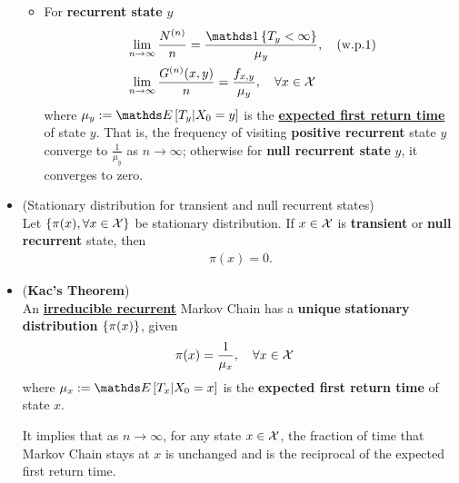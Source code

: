 \documentclass[11pt]{article}
\begin{document}
\begin{itemize}
\begin{itemize}
\item \begin{theorem}
For \textbf{recurrent state} $y$
\begin{align*}
&\lim_{n\rightarrow \infty}\frac{N^{(n)}}{n} = \frac{\ind{T_{y} < \infty}}{\mu_{y}}, \quad (\text{w.p.1})\\
&\lim_{n\rightarrow \infty}\frac{G^{(n)}(x, y)}{n} = \frac{f_{x,y}}{\mu_{y}}, \quad \forall x\in \cX
\end{align*} where $\mu_{y} := \E{}{T_{y} | X_{0} = y}$  is the \underline{\textbf{expected first return time}} of state $y$.
That is, the frequency of visiting \textbf{positive recurrent} state $y$ converge to $\frac{1}{\mu_{y}}$ as $n\rightarrow \infty$; otherwise for \textbf{null recurrent state} $y$, it converges to zero.
\end{theorem}
\end{itemize}

\item 
\begin{theorem} (Stationary distribution for transient and null recurrent states)\\
Let $\left\{\pi(x), \forall x\in {\mathcal X}\right\}$  be stationary distribution. If $x \in {\mathcal X}$ is \textbf{transient} or \textbf{null recurrent} state, then 
\begin{align*}
\pi(x) = 0.
\end{align*} 
\end{theorem}

\item \begin{theorem} (\textbf{Kac's Theorem})\citep{ross2014introduction}\\
An \underline{\textbf{irreducible recurrent}} Markov Chain has a \textbf{unique} \textbf{stationary distribution} $\left\{\pi(x)\right\}$, given 
\begin{align}
\pi(x) &= \frac{1}{\mu_x}, \quad \forall x\in {\mathcal X}
\end{align} where $\mu_{x} := \E{}{T_{x} | X_{0} = x}$  is the \textbf{expected first return time} of state $x$.
\end{theorem} It implies that as $n\rightarrow \infty$, for any state $x\in {\mathcal X}$, the fraction of time that Markov Chain stays at $x$ is unchanged and is the reciprocal of the expected first return time.
\end{itemize}
\end{document}
